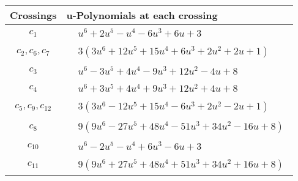 \documentclass[1p]{elsarticle_modified}
\theoremstyle{definition}
\begin{document}
\begin{tabular}{m{50pt}|m{274pt}}
Crossings & \hspace{64pt}u-Polynomials at each crossing \\
\hline $$\begin{aligned}c_{1}\end{aligned}$$&$\begin{aligned}
&u^6+2 u^5- u^4-6 u^3+6 u+3
\end{aligned}$\\
\hline $$\begin{aligned}c_{2},c_{6},c_{7}\end{aligned}$$&$\begin{aligned}
&3(3 u^6+12 u^5+15 u^4+6 u^3+2 u^2+2 u+1)
\end{aligned}$\\
\hline $$\begin{aligned}c_{3}\end{aligned}$$&$\begin{aligned}
&u^6-3 u^5+4 u^4-9 u^3+12 u^2-4 u+8
\end{aligned}$\\
\hline $$\begin{aligned}c_{4}\end{aligned}$$&$\begin{aligned}
&u^6+3 u^5+4 u^4+9 u^3+12 u^2+4 u+8
\end{aligned}$\\
\hline $$\begin{aligned}c_{5},c_{9},c_{12}\end{aligned}$$&$\begin{aligned}
&3(3 u^6-12 u^5+15 u^4-6 u^3+2 u^2-2 u+1)
\end{aligned}$\\
\hline $$\begin{aligned}c_{8}\end{aligned}$$&$\begin{aligned}
&9(9 u^6-27 u^5+48 u^4-51 u^3+34 u^2-16 u+8)
\end{aligned}$\\
\hline $$\begin{aligned}c_{10}\end{aligned}$$&$\begin{aligned}
&u^6-2 u^5- u^4+6 u^3-6 u+3
\end{aligned}$\\
\hline $$\begin{aligned}c_{11}\end{aligned}$$&$\begin{aligned}
&9(9 u^6+27 u^5+48 u^4+51 u^3+34 u^2+16 u+8)
\end{aligned}$\\
\hline
\end{tabular}\\~\\
\end{document}
